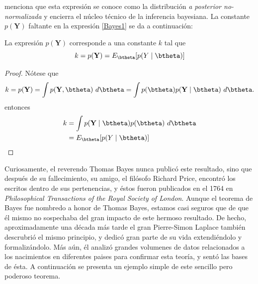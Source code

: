 \documentclass[10pt,openright]{book}\usepackage[]{graphicx}\usepackage[]{color}
\begin{document}
 menciona que esta expresión se conoce como la distribución \emph{a posterior no-normalizada} y encierra el núcleo técnico de la inferencia bayesiana. La constante $p(\mathbf{Y})$ faltante en la expresión {\ref{Bayes1}} se da a continuación:

\begin{Res}\label{Res131}
La expresión $p(\mathbf{Y})$ corresponde a una constante $k$ tal que
\begin{equation*}
k=p(\mathbf{Y})=E_{\btheta}[p(Y \mid \btheta)]
\end{equation*}
\end{Res}

\begin{proof}
Nótese que
\begin{equation*}
k=p(\mathbf{Y})=\int p(\mathbf{Y},\btheta)\ d\btheta=\int p(\btheta)p(\mathbf{Y} \mid \btheta)\ d\btheta.
\end{equation*}
entonces
\begin{align*}
k&=\int p(\mathbf{Y} \mid \btheta)p(\btheta)\ d\btheta\\
&=E_{\btheta}[p(Y \mid \btheta)]
\end{align*}
\end{proof}

Curiosamente, el reverendo Thomas Bayes nunca publicó este resultado, sino que después de su fallecimiento, su amigo, el filósofo Richard Price, encontró los escritos dentro de sus pertenencias, y éstos fueron publicados en el 1764 en \emph{Philosophical Transactions of the Royal Society of London}. Aunque el teorema de Bayes fue nombredo a honor de Thomas Bayes, estamos casi seguros que de que él mismo no sospechaba del gran impacto de este hermoso resultado. De hecho, aproximadamente una década más tarde el gran Pierre-Simon Laplace también descrubrió el mismo principio, y dedicó gran parte de su vida extendiéndolo y formalizándolo. Más aún, él analizó grandes volumenes de datos relacionados a los nacimientos en diferentes paises para confirmar esta teoría, y sentó las bases de ésta. A continuación se presenta un ejemplo simple de este sencillo pero poderoso teorema.
\end{document}
